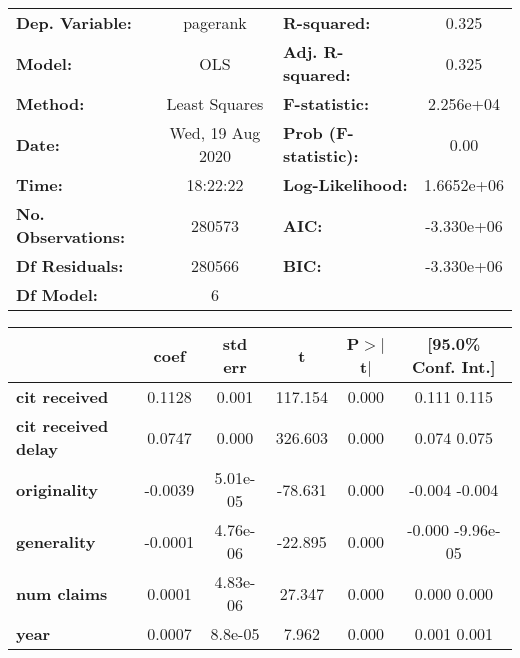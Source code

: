 \begin{center}
\begin{tabular}{lclc}
\toprule
\textbf{Dep. Variable:}     &     pagerank     & \textbf{  R-squared:         } &       0.325    \\
\textbf{Model:}             &       OLS        & \textbf{  Adj. R-squared:    } &       0.325    \\
\textbf{Method:}            &  Least Squares   & \textbf{  F-statistic:       } &   2.256e+04    \\
\textbf{Date:}              & Wed, 19 Aug 2020 & \textbf{  Prob (F-statistic):} &       0.00     \\
\textbf{Time:}              &     18:22:22     & \textbf{  Log-Likelihood:    } &   1.6652e+06   \\
\textbf{No. Observations:}  &      280573      & \textbf{  AIC:               } &   -3.330e+06   \\
\textbf{Df Residuals:}      &      280566      & \textbf{  BIC:               } &   -3.330e+06   \\
\textbf{Df Model:}          &           6      & \textbf{                     } &                \\
\bottomrule
\end{tabular}
\begin{tabular}{lccccc}
                            & \textbf{coef} & \textbf{std err} & \textbf{t} & \textbf{P$>$$|$t$|$} & \textbf{[95.0\% Conf. Int.]}  \\
\midrule
\textbf{cit received}       &       0.1128  &        0.001     &   117.154  &         0.000        &         0.111     0.115       \\
\textbf{cit received delay} &       0.0747  &        0.000     &   326.603  &         0.000        &         0.074     0.075       \\
\textbf{originality}        &      -0.0039  &     5.01e-05     &   -78.631  &         0.000        &        -0.004    -0.004       \\
\textbf{generality}         &      -0.0001  &     4.76e-06     &   -22.895  &         0.000        &        -0.000 -9.96e-05       \\
\textbf{num claims}         &       0.0001  &     4.83e-06     &    27.347  &         0.000        &         0.000     0.000       \\
\textbf{year}               &       0.0007  &      8.8e-05     &     7.962  &         0.000        &         0.001     0.001       \\

\end{tabular}
\end{center}
